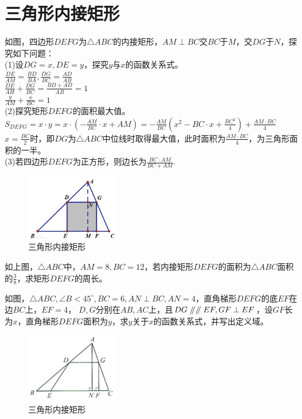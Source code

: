 \documentclass{ecnuthesis}
\newcommand\px{\mathrel{/\mkern-5mu/}}  %
\begin{document}
\section{三角形内接矩形}
\begin{model}
    如图，四边形$DEFG$为$\triangle ABC$的内接矩形，$AM\perp BC$交$BC$于$M$，交$DG$于$N$，探究如下问题：\\
    (1)设$DG=x,DE=y$，探究$y$与$x$的函数关系式。\\
    $\frac{DE}{AM}=\frac{BD}{BA},\frac{DG}{BC}=\frac{AD}{AB}$ \\
    $\frac{DE}{AH}+\frac{DG}{BC}=\frac{BD+AD}{AB}=1$ \\
    $\frac{y}{AM}+\frac{x}{BC}=1$ \\
    (2)探究矩形$DEFG$的面积最大值。\\
    $S_{DEFG}=x·y=x·(-\frac{AM}{BC}·x+AM)=-\frac{AM}{BC}(x^2-BC·x+\frac{BC^2}{4})+\frac{AM·BC}{4}$ \\
    $x=\frac{BC}{2}$时，即$DG$为$\triangle ABC$中位线时取得最大值，此时面积为$\frac{AM·BC}{4}$，为三角形面积的一半。\\
    (3)若四边形$DEFG$为正方形，则边长为$\frac{BC·AM}{BC+AM}.$ \\
\end{model}
\begin{figure}[H]
\centering
\includegraphics[width=4cm]{picture/825.png}
\caption{三角形内接矩形}
\end{figure}
\begin{problem}
    如上图，$\triangle ABC$中，$AM=8,BC=12$，若内接矩形$DEFG$的面积为$\triangle ABC$面积的$\frac{3}{8}$，求矩形$DEFG$的周长。\\
\end{problem}
\begin{problem}
    如图，$\triangle ABC,\angle B<45^\circ,BC=6,AN\perp BC,AN=4$，直角梯形$DEFG$的底$EF$在边$BC$上，$EF=4$，
    $D,G$分别在$AB,AC$上，且$DG\px \px EF,GF\perp EF$，设$GF$长为$x$，直角梯形$DEFG$面积为$y$，求$y$关于$x$的函数关系式，并写出定义域。\\
\end{problem}
\begin{figure}[H]
\centering
\includegraphics[width=4cm]{picture/829.png}
\caption{三角形内接矩形}
\end{figure}
\clearpage
\end{document}
